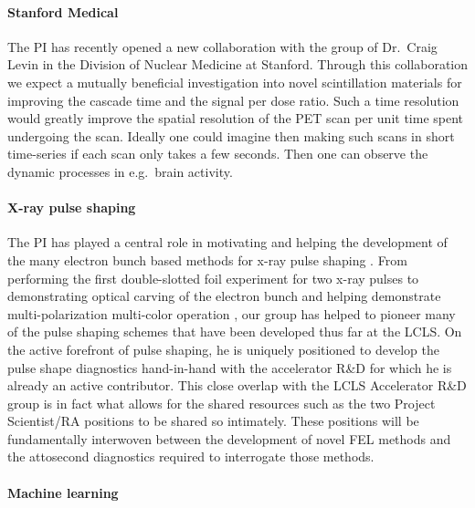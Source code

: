 \paragraph*{Stanford Medical}
The PI has recently opened a new collaboration with the group of Dr.~Craig Levin in the Division of Nuclear Medicine at Stanford.
Through this collaboration we expect a mutually beneficial investigation into novel scintillation materials for improving the cascade time and the signal per dose ratio.
Such a time resolution would greatly improve the spatial resolution of the PET scan per unit time spent undergoing the scan. 
Ideally one could imagine then making such scans in short time-series if each scan only takes a few seconds.
Then one can observe the dynamic processes in e.g.~brain activity.

\paragraph*{X-ray pulse shaping}
The PI has played a central role in motivating and helping the development of the many electron bunch based methods for x-ray pulse shaping \cite{Lutman13_twocolor,Marinelli13_twocolor,Helml2014,Marinelli2015,Lutman2016,Marinelli2016}.
From performing the first double-slotted foil experiment for two x-ray pulses \cite{CoffeeDAMOP11} to demonstrating optical carving of the electron bunch \cite{Marinelli2016} and helping demonstrate multi-polarization multi-color operation \cite{Lutman2016}, our group has helped to pioneer many of the pulse shaping schemes that have been developed thus far at the LCLS.
On the active forefront of pulse shaping, he is uniquely positioned to develop the pulse shape diagnostics hand-in-hand with the accelerator R\&D for which he is already an active contributor.
This close overlap with the LCLS Accelerator R\&D group is in fact what allows for the shared resources such as the two Project Scientist/RA positions to be shared so intimately.
These positions will be fundamentally interwoven between the development of novel FEL methods and the attosecond diagnostics required to interrogate those methods.


\paragraph*{Machine learning}

